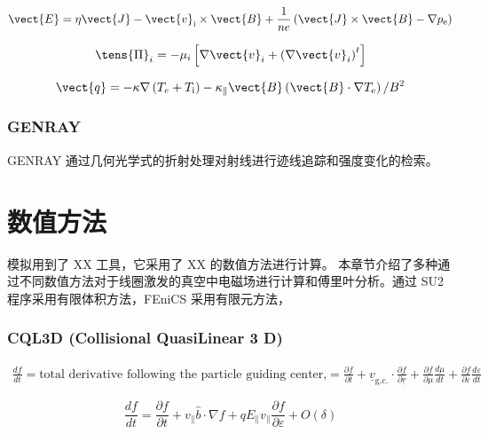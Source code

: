 \begin{equation}\vect{E}=\eta \vect{J}-\vect{v}_{\mathrm{i}} \times \vect{B}+\frac{1}{n e}\left(\vect{J} \times \vect{B}-\nabla p_{\mathrm{e}}\right)\end{equation}

\begin{equation}\tens{\Pi}_{i}=-\mu_{i}\left[\nabla \vect{v}_{i}+\left(\nabla \vect{v}_{i}\right)^{t}\right]\end{equation}

\begin{equation}\vect{q}=-\kappa \nabla\left(T_{e}+T_{\mathrm{i}}\right)-\kappa_{\|} \vect{B}\left(\vect{B} \cdot \nabla T_{\mathrm{e}}\right) / B^{2}\end{equation}

    
\subsubsection{GENRAY}
GENRAY 通过几何光学式的折射处理对射线进行迹线追踪和强度变化的检索。

\section{数值方法}
模拟用到了 XX 工具，它采用了 XX 的数值方法进行计算。
本章节介绍了多种通过不同数值方法对于线圈激发的真空中电磁场进行计算和傅里叶分析。通过 SU2 程序采用有限体积方法，FEniCS 采用有限元方法，


\subsubsection{CQL3D (Collisional QuasiLinear 3 D)}

\begin{multline}
\frac{d f}{d t}=\text{total derivative following the particle guiding center,}
=\frac{\partial f}{\partial t}+\underline{v}_{\mathrm{g.c.}} \cdot \frac{\partial f}{\partial \underline{r}}+\frac{\partial f}{\partial \mu} \frac{d \mu}{d t}+\frac{\partial f}{\partial \varepsilon} \frac{d \varepsilon}{d t}
\end{multline}


\begin{equation}\frac{d f}{d t}=\frac{\partial f}{\partial t}+v_{\|} \hat{b} \cdot \nabla f+q E_{\|} v_{\|} \frac{\partial f}{\partial \varepsilon}+O(\delta)\end{equation}